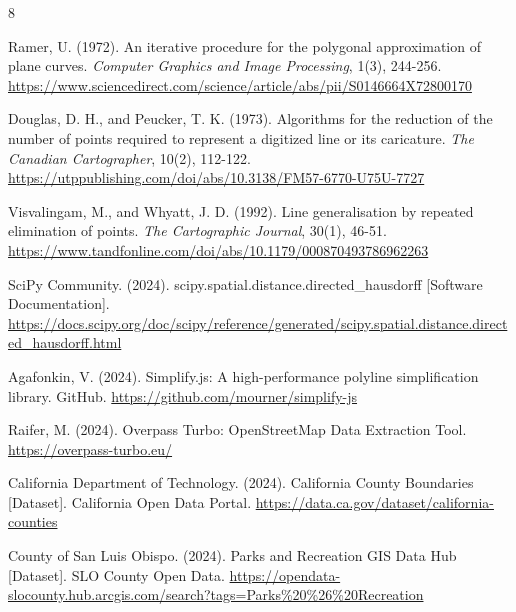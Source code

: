 \documentclass[12pt]{article}
\begin{document}
\newpage
\begin{thebibliography}{8}

    Ramer, U. (1972). An iterative procedure for the polygonal approximation of plane curves. \textit{Computer Graphics and Image Processing}, 1(3), 244-256. \url{https://www.sciencedirect.com/science/article/abs/pii/S0146664X72800170}

    Douglas, D. H., and Peucker, T. K. (1973). Algorithms for the reduction of the number of points required to represent a digitized line or its caricature. \textit{The Canadian Cartographer}, 10(2), 112-122. \url{https://utppublishing.com/doi/abs/10.3138/FM57-6770-U75U-7727}

    Visvalingam, M., and Whyatt, J. D. (1992). Line generalisation by repeated elimination of points. \textit{The Cartographic Journal}, 30(1), 46-51. \url{https://www.tandfonline.com/doi/abs/10.1179/000870493786962263}

    SciPy Community. (2024). scipy.spatial.distance.directed\_hausdorff [Software Documentation]. \url{https://docs.scipy.org/doc/scipy/reference/generated/scipy.spatial.distance.directed_hausdorff.html}

    Agafonkin, V. (2024). Simplify.js: A high-performance polyline simplification library. GitHub. \url{https://github.com/mourner/simplify-js}

    Raifer, M. (2024). Overpass Turbo: OpenStreetMap Data Extraction Tool. \url{https://overpass-turbo.eu/}

    California Department of Technology. (2024). California County Boundaries [Dataset]. California Open Data Portal. \url{https://data.ca.gov/dataset/california-counties}

    County of San Luis Obispo. (2024). Parks and Recreation GIS Data Hub [Dataset]. SLO County Open Data. \url{https://opendata-slocounty.hub.arcgis.com/search?tags=Parks\%20\%26\%20Recreation}

\end{thebibliography}
\end{document}
